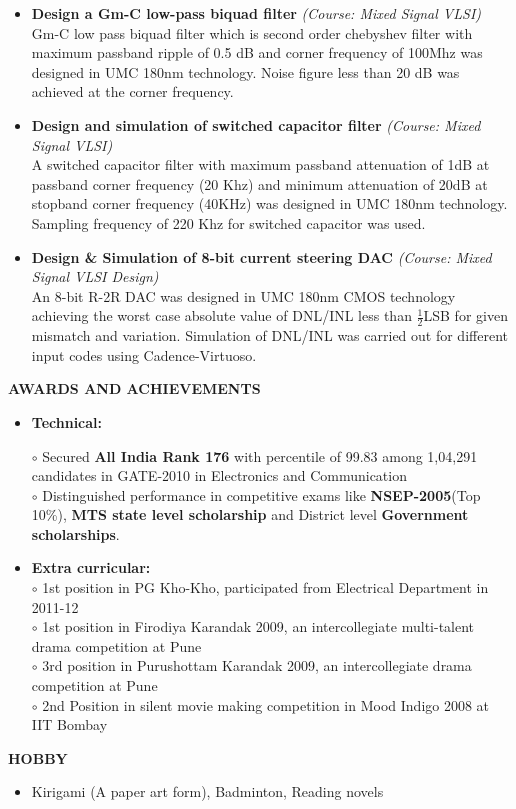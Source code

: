 \documentclass[a4paper,10pt]{article}
\begin{document}
\begin{itemize}
   \item \textbf{{Design a Gm-C low-pass biquad filter}} \textit{(Course: Mixed Signal VLSI)}\\
 	Gm-C low pass biquad filter which is second order chebyshev filter with maximum passband ripple of 0.5 dB and corner frequency
 	of 100Mhz was designed in UMC 180nm technology. Noise figure less than 20 dB was achieved at the corner frequency. 
   
   \item \textbf{{Design and simulation of switched capacitor filter}} \textit{(Course: Mixed Signal VLSI)}\\
 	A switched capacitor filter with maximum passband attenuation of 1dB at passband corner frequency (20 Khz) and minimum attenuation
 	of 20dB at stopband corner frequency (40KHz) was designed in UMC 180nm technology. Sampling frequency of 220 Khz for switched capacitor was used. 
	
	
   \item \textbf{{Design \& Simulation of 8-bit current steering DAC}}   \textit{(Course: Mixed Signal VLSI Design)}\\
    An 8-bit R-2R DAC was designed in UMC 180nm CMOS technology achieving the worst case absolute value of DNL/INL less than
    $\frac{1}{2}$LSB for given mismatch and variation. Simulation of DNL/INL was carried out for different input codes using Cadence-Virtuoso.
	
  
 \end{itemize}

 \colorbox{titleColor}{\parbox{6.5in}{\textbf{AWARDS AND ACHIEVEMENTS}}}

 \begin{itemize}
 
  \item \textbf{{Technical:}}

  $\circ$ Secured  \textbf{All India Rank 176} with percentile of 99.83 among 1,04,291 candidates in GATE-2010 in Electronics and Communication\\
  $\circ$ Distinguished performance in competitive exams like \textbf{NSEP-2005}(Top 10\%), \textbf{MTS state level scholarship} and District level \textbf{Government scholarships}.
 
  \item \textbf{{Extra curricular:}}\\
  $\circ$ 1st position in PG Kho-Kho, participated from Electrical Department in 2011-12\\
  $\circ$ 1st position in Firodiya Karandak 2009, an intercollegiate multi-talent drama competition at Pune\\
  $\circ$ 3rd position in Purushottam Karandak 2009, an intercollegiate drama competition at Pune\\
  $\circ$ 2nd Position in silent movie making competition in Mood Indigo 2008 at IIT Bombay 
  
  


 \end{itemize}

 \colorbox{titleColor}{\parbox{6.5in}{\textbf{HOBBY}}}

 \begin{itemize}
  \setlength{\itemsep}{1pt}
  \item Kirigami (A paper art form), Badminton, Reading novels
 \end{itemize}
\end{document}
